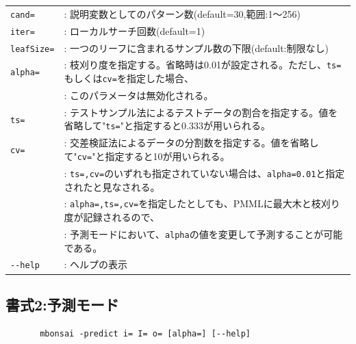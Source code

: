 \begin{table}[htbp]
{\begin{tabular}{ll}
\verb|cand=|  & : 説明変数としてのパターン数(default=30,範囲:1〜256) \\
\verb|iter=|  & : ローカルサーチ回数(default=1) \\
\verb|leafSize=| & : 一つのリーフに含まれるサンプル数の下限(default:制限なし) \\
\verb|alpha=|    & : 枝刈り度を指定する。省略時は0.01が設定される。ただし、\verb|ts=|もしくは\verb|cv=|を指定した場合、\\
                 & : このパラメータは無効化される。\\
\verb|ts=|       & : テストサンプル法によるテストデータの割合を指定する。値を省略して"\verb|ts=|"と指定すると0.333が用いられる。 \\
\verb|cv=|       & : 交差検証法によるデータの分割数を指定する。値を省略して"\verb|cv=|"と指定すると10が用いられる。 \\
                 & : \verb|ts=,cv=|のいずれも指定されていない場合は、\verb|alpha=0.01|と指定されたと見なされる。\\
                 & : \verb|alpha=,ts=,cv=|を指定したとしても、PMMLに最大木と枝刈り度が記録されるので、\\
                 & : 予測モードにおいて、\verb|alpha|の値を変更して予測することが可能である。\\
\verb|--help|    & : ヘルプの表示 \\

\end{tabular} 
}
\end{table} 

\newpage
\subsection{書式2:予測モード}

\begin{verbatim}
       mbonsai -predict i= I= o= [alpha=] [--help]
\end{verbatim}

